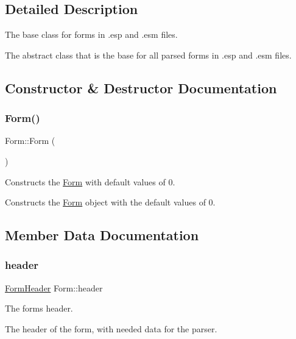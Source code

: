 \subsection{Detailed Description}
The base class for forms in .esp and .esm files. 

The abstract class that is the base for all parsed forms in .esp and .esm files. 

\subsection{Constructor \& Destructor Documentation}
\mbox{\label{class_form_a74d41f789dbfcfd081b241e2c44e576a}} 
\subsubsection{\texorpdfstring{Form()}{Form()}}
{\footnotesize\ttfamily Form\+::\+Form (\begin{DoxyParamCaption}{ }\end{DoxyParamCaption})}



Constructs the \hyperlink{class_form}{Form} with default values of 0. 

Constructs the \hyperlink{class_form}{Form} object with the default values of 0. 

\subsection{Member Data Documentation}
\mbox{\label{class_form_a6aec4c07386c72bb12947f7766562856}} 
\subsubsection{\texorpdfstring{header}{header}}
{\footnotesize\ttfamily \hyperlink{struct_form_header}{Form\+Header} Form\+::header\hspace{0.3cm}{\ttfamily [protected]}}



The form\textquotesingle{}s header. 

The header of the form, with needed data for the parser. \mbox{\label{class_form_a3a19912be281bc3e9c99911bb70e0f4b}} 

